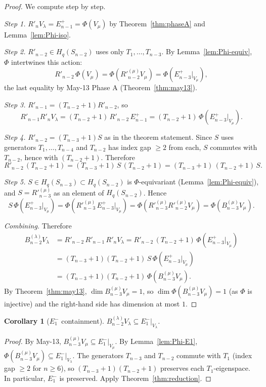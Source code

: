 \documentclass[11pt]{article}
\newtheorem{corollary}[theorem]{Corollary}
\theoremstyle{definition}
\begin{document}
\begin{proof}
We compute step by step.

\emph{Step 1.}  $R'_n V_\lambda=E_{n-1}^+=\Phi(V_\mu)$ by
Theorem~\ref{thm:phaseA} and Lemma~\ref{lem:Phi-iso}.

\emph{Step 2.}  $R'_{n-2}\in H_q(S_{n-2})$ uses only $T_1,\ldots,T_{n-3}$.
By Lemma~\ref{lem:Phi-equiv}, $\Phi$ intertwines this action:
\[
   R'_{n-2}\,\Phi(V_\mu)=\Phi(R'^{(\mu)}_{n-2} V_\mu)
   =\Phi(E_{n-3}^+|_{V_\mu}),
\]
the last equality by May-13 Phase A (Theorem~\ref{thm:may13}).

\emph{Step 3.}  $R'_{n-1}=(T_{n-2}{+}1)R'_{n-2}$, so
\[
   R'_{n-1}R'_n V_\lambda=(T_{n-2}{+}1)\,R'_{n-2}\,E_{n-1}^+
   =(T_{n-2}{+}1)\,\Phi(E_{n-3}^+|_{V_\mu}).
\]

\emph{Step 4.}  $R'_{n-2}=(T_{n-3}{+}1)S$ as in the theorem statement.
Since $S$ uses generators $T_1,\ldots,T_{n-4}$ and $T_{n-2}$ has
index gap $\ge 2$ from each, $S$ commutes with $T_{n-2}$, hence with
$(T_{n-2}{+}1)$.  Therefore
\[
   R'_{n-2}\,(T_{n-2}{+}1)
   = (T_{n-3}{+}1)\,S\,(T_{n-2}{+}1)
   = (T_{n-3}{+}1)\,(T_{n-2}{+}1)\,S.
\]

\emph{Step 5.}  $S\in H_q(S_{n-3})\subset H_q(S_{n-2})$ is
$\Phi$-equivariant (Lemma~\ref{lem:Phi-equiv}), and
$S=R'^{(\mu)}_{n-3}$ as an element of $H_q(S_{n-2})$.  Hence
\[
   S\,\Phi(E_{n-3}^+|_{V_\mu})
   = \Phi(R'^{(\mu)}_{n-3}\,E_{n-3}^+|_{V_\mu})
   = \Phi(R'^{(\mu)}_{n-3}R'^{(\mu)}_{n-2} V_\mu)
   = \Phi(B_{n-3}^{(\mu)} V_\mu).
\]

\emph{Combining.}  Therefore
\begin{align*}
   B_{n-2}^{(\lambda)} V_\lambda
   &= R'_{n-2}\,R'_{n-1}\,R'_n V_\lambda
   = R'_{n-2}\,(T_{n-2}{+}1)\,\Phi(E_{n-3}^+|_{V_\mu}) \\
   &= (T_{n-3}{+}1)(T_{n-2}{+}1)\,S\,\Phi(E_{n-3}^+|_{V_\mu}) \\
   &= (T_{n-3}{+}1)(T_{n-2}{+}1)\,\Phi(B_{n-3}^{(\mu)} V_\mu).
\end{align*}
By Theorem~\ref{thm:may13}, $\dim B_{n-3}^{(\mu)} V_\mu=1$, so
$\dim\Phi(B_{n-3}^{(\mu)}V_\mu)=1$ (as $\Phi$ is injective) and
the right-hand side has dimension at most $1$.
\end{proof}

\begin{corollary}[$E_1^-$ containment]\label{cor:E1-containment}
$B_{n-2}^{(\lambda)} V_\lambda\subseteq E_1^-|_{V_\lambda}$.
\end{corollary}

\begin{proof}
By May-13, $B_{n-3}^{(\mu)}V_\mu\subseteq E_1^-|_{V_\mu}$.  By
Lemma~\ref{lem:Phi-E1}, $\Phi(B_{n-3}^{(\mu)}V_\mu)\subseteq
E_1^-|_{V_\lambda}$.  The generators $T_{n-3}$ and $T_{n-2}$
commute with $T_1$ (index gap $\ge 2$ for $n\ge 6$), so
$(T_{n-3}{+}1)(T_{n-2}{+}1)$ preserves each $T_1$-eigenspace.
In particular, $E_1^-$ is preserved.  Apply
Theorem~\ref{thm:reduction}.
\end{proof}
\end{document}
